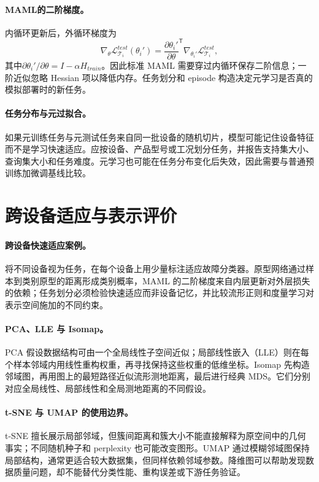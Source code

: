 \paragraph{MAML的二阶梯度。}
内循环更新后，外循环梯度为
\begin{equation}
 \nabla_\theta\mathcal{L}_{\mathcal{T}_i}^{test}(\theta_i')
 =\frac{\partial\theta_i'}{\partial\theta}^{\mathsf T}
 \nabla_{\theta_i'}\mathcal{L}_{\mathcal{T}_i}^{test},
\end{equation}
其中$\partial\theta_i'/\partial\theta=I-\alpha H_{train}$。因此标准 MAML 需要穿过内循环保存二阶信息；一阶近似忽略 Hessian 项以降低内存。任务划分和 episode 构造决定元学习是否真的模拟部署时的新任务。

\paragraph{任务分布与元过拟合。}
如果元训练任务与元测试任务来自同一批设备的随机切片，模型可能记住设备特征而不是学习快速适应。应按设备、产品型号或工况划分任务，并报告支持集大小、查询集大小和任务难度。元学习也可能在任务分布变化后失效，因此需要与普通预训练加微调基线比较。

\section{跨设备适应与表示评价}
\paragraph{跨设备快速适应案例。}
将不同设备视为任务，在每个设备上用少量标注适应故障分类器。原型网络通过样本到类别原型的距离形成类别概率，MAML 的二阶梯度来自内层更新对外层损失的依赖；任务划分必须检验快速适应而非设备记忆，并比较流形正则和度量学习对表示空间施加的不同约束。

\paragraph{PCA、LLE 与 Isomap。}
PCA 假设数据结构可由一个全局线性子空间近似；局部线性嵌入（LLE）则在每个样本邻域内用线性重构权重，再寻找保持这些权重的低维坐标。Isomap 先构造邻域图，再用图上的最短路径近似流形测地距离，最后进行经典 MDS。它们分别对应全局线性、局部线性和全局测地距离的不同假设。

\paragraph{t-SNE 与 UMAP 的使用边界。}
t-SNE 擅长展示局部邻域，但簇间距离和簇大小不能直接解释为原空间中的几何事实；不同随机种子和 perplexity 也可能改变图形。UMAP 通过模糊邻域图保持局部结构，通常更适合较大数据集，但同样依赖邻域参数。降维图可以帮助发现数据质量问题，却不能替代分类性能、重构误差或下游任务验证。

